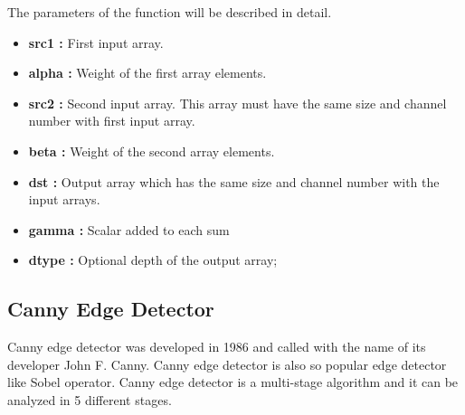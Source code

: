   The parameters of the function will be described in detail.
  
    \begin{itemize}

\item \textbf{src1 : }First input array.

\item \textbf{alpha : }Weight of the first array elements.

\item \textbf{src2 : }Second input array. This array must have the same size and channel number with first input array.

\item \textbf{beta : }Weight of the second array elements.

\item \textbf{dst : }Output array which has the same size and channel number with the input arrays.

\item \textbf{gamma : }Scalar added to each sum

\item \textbf{dtype : }Optional depth of the output array;

 \end{itemize}
 
%
\subsection{Canny Edge Detector}\label{sec:Canny Edge Detector}

Canny edge detector was developed in 1986 and called with the name of its developer John F. Canny. Canny edge detector is also so popular edge detector like Sobel operator. Canny edge detector is a multi-stage algorithm and it can be analyzed in 5 different stages.\cite{Canny_Edge_Detector2}

